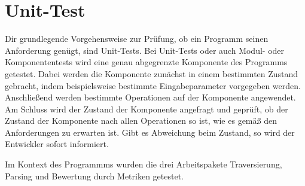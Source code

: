 \section{Unit-Test}
Dir grundlegende Vorgehensweise zur Prüfung, ob ein Programm seinen Anforderung genügt, sind Unit-Tests. Bei Unit-Tests oder auch Modul- oder Komponententests wird eine genau abgegrenzte Komponente des Programms getestet. Dabei werden die Komponente zunächst in einem bestimmten Zustand gebracht, indem beispielsweise bestimmte Eingabeparameter vorgegeben werden. Anschließend werden bestimmte Operationen auf der Komponente angewendet. Am Schluss wird der Zustand der Komponente angefragt und geprüft, ob der Zustand der Komponente nach allen Operationen so ist, wie es gemäß den Anforderungen zu erwarten ist. Gibt es Abweichung beim Zustand, so wird der Entwickler sofort informiert. 

Im Kontext des Programmms wurden die drei Arbeitspakete Traversierung, Parsing und Bewertung durch Metriken getestet.
